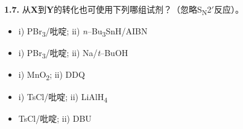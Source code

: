 \noindent\textbf{1.7.} 从\textbf{X}到\textbf{Y}的转化也可使用下列哪组试剂？（忽略S\textsubscript{N}2$'$反应）。

\renewcommand{\labelitemi}{$\square$}
\begin{itemize}
	\item i) PBr\textsubscript{3}/吡啶; ii)  \textit{n}--Bu\textsubscript{3}SnH/AIBN
	\item i) PBr\textsubscript{3}/吡啶; ii) Na/\emph{t}--BuOH
	\item i) MnO\textsubscript{2}; ii) DDQ
	\item i) TsCl/吡啶; ii) LiAlH\textsubscript{4}
	\item TsCl/吡啶; ii) DBU
\end{itemize}
\renewcommand{\labelitemi}{$\bullet$}
